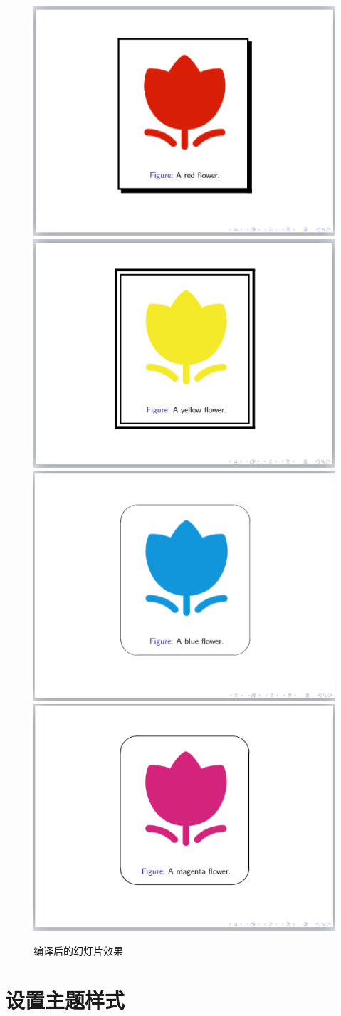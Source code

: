 \begin{figure}[htbp]
    \centering
    \includegraphics[width = 0.45\linewidth]{images/ch_9/NEWexample11_1.png}
    \includegraphics[width = 0.45\linewidth]{images/ch_9/NEWexample11_2.png}
    \includegraphics[width = 0.45\linewidth]{images/ch_9/NEWexample11_3.png}
    \includegraphics[width = 0.45\linewidth]{images/ch_9/NEWexample11_4.png}
    \caption{编译后的幻灯片效果}
    \label{fig:923}
\end{figure}

\section{设置主题样式}

